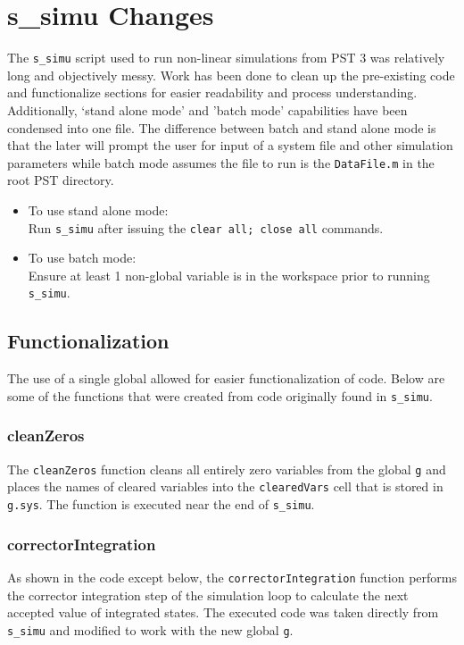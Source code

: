 \pagebreak
\section{s\_simu Changes}
The \verb|s_simu| script used to run non-linear simulations from PST 3 was relatively long and objectively messy.
Work has been done to clean up the pre-existing code and functionalize sections for easier readability and process understanding.
Additionally, `stand alone mode' and 'batch mode' capabilities have been condensed into one file.
The difference between batch and stand alone mode is that the later will prompt the user for input of a system file and other simulation parameters while batch mode assumes the file to run is the \verb|DataFile.m| in the root PST directory.
\begin{itemize}
\item To use stand alone mode:\\
Run \verb|s_simu| after issuing the \verb|clear all; close all| commands.
\item To use batch mode:\\
Ensure at least 1 non-global variable is in the workspace prior to running \verb|s_simu|.
\end{itemize}


\subsection{Functionalization}
The use of a single global allowed for easier functionalization of code.
Below are some of the functions that were created from code originally found in \verb|s_simu|.

\subsubsection{cleanZeros}  
The \verb|cleanZeros| function cleans all entirely zero variables from the global \verb|g| and places the names of cleared variables into the \verb|clearedVars| cell that is stored in \verb|g.sys|.
The function is executed near the end of \verb|s_simu|.

\subsubsection{correctorIntegration}  
As shown in the code except below, the \verb|correctorIntegration| function performs the corrector integration step of the simulation loop to calculate the next accepted value of integrated states.
The executed code was taken directly from \verb|s_simu| and modified to work with the new global \verb|g|.

